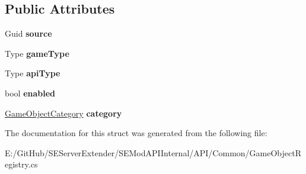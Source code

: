 \subsection*{Public Attributes}
\begin{DoxyCompactItemize}
\item 
\hypertarget{struct_s_e_mod_a_p_i_internal_1_1_a_p_i_1_1_common_1_1_game_object_type_entry_a81efe79c825df7654e149c48527fdc4d}{}Guid {\bfseries source}\label{struct_s_e_mod_a_p_i_internal_1_1_a_p_i_1_1_common_1_1_game_object_type_entry_a81efe79c825df7654e149c48527fdc4d}

\item 
\hypertarget{struct_s_e_mod_a_p_i_internal_1_1_a_p_i_1_1_common_1_1_game_object_type_entry_a2deb0c00bd9ba95597dfc62d2b96a6e9}{}Type {\bfseries game\+Type}\label{struct_s_e_mod_a_p_i_internal_1_1_a_p_i_1_1_common_1_1_game_object_type_entry_a2deb0c00bd9ba95597dfc62d2b96a6e9}

\item 
\hypertarget{struct_s_e_mod_a_p_i_internal_1_1_a_p_i_1_1_common_1_1_game_object_type_entry_a92e5791d463033be7a395b045e0e7487}{}Type {\bfseries api\+Type}\label{struct_s_e_mod_a_p_i_internal_1_1_a_p_i_1_1_common_1_1_game_object_type_entry_a92e5791d463033be7a395b045e0e7487}

\item 
\hypertarget{struct_s_e_mod_a_p_i_internal_1_1_a_p_i_1_1_common_1_1_game_object_type_entry_a111929452ec3a30d2d7d2cc39f3f32b0}{}bool {\bfseries enabled}\label{struct_s_e_mod_a_p_i_internal_1_1_a_p_i_1_1_common_1_1_game_object_type_entry_a111929452ec3a30d2d7d2cc39f3f32b0}

\item 
\hypertarget{struct_s_e_mod_a_p_i_internal_1_1_a_p_i_1_1_common_1_1_game_object_type_entry_a3feff9b5f79598598fc1b9d05c4c5e8e}{}\hyperlink{struct_s_e_mod_a_p_i_internal_1_1_a_p_i_1_1_common_1_1_game_object_category}{Game\+Object\+Category} {\bfseries category}\label{struct_s_e_mod_a_p_i_internal_1_1_a_p_i_1_1_common_1_1_game_object_type_entry_a3feff9b5f79598598fc1b9d05c4c5e8e}

\end{DoxyCompactItemize}


The documentation for this struct was generated from the following file\+:\begin{DoxyCompactItemize}
\item 
E\+:/\+Git\+Hub/\+S\+E\+Server\+Extender/\+S\+E\+Mod\+A\+P\+I\+Internal/\+A\+P\+I/\+Common/Game\+Object\+Registry.\+cs\end{DoxyCompactItemize}
